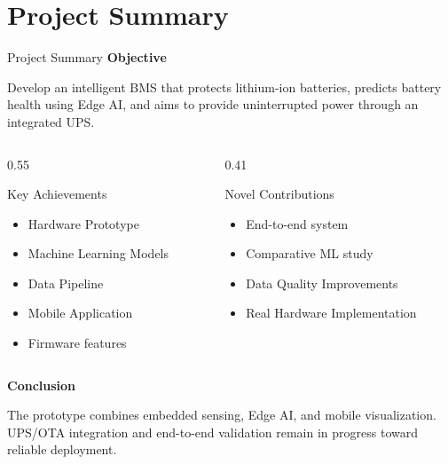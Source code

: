 \documentclass[10pt,aspectratio=43]{beamer}
\begin{document}
\section{Project Summary}
\begin{frame}{Project Summary}
  \footnotesize
  \textbf{Objective}\par
  \vspace{2pt}
  Develop an intelligent BMS that protects lithium-ion batteries, predicts battery health using Edge AI, and aims to provide uninterrupted power through an integrated UPS.
  \vspace{7pt}
 
  \begin{columns}[T,onlytextwidth]
    \begin{column}{0.55\textwidth}
      \begin{block}{Key Achievements}
        \begin{itemize}
          \setlength{\itemsep}{3pt}
            \item Hardware Prototype
            \item Machine Learning Models
            \item Data Pipeline
            \item Mobile Application
            \item Firmware features
        \end{itemize}
      \end{block}
    \end{column}
    \begin{column}{0.41\textwidth}
      \begin{block}{Novel Contributions}
        \begin{itemize}
          \setlength{\itemsep}{4pt}
          \item End-to-end system
          \item Comparative ML study
          \item Data Quality Improvements
          \item Real Hardware Implementation
        \end{itemize}
      \end{block}
    \end{column}
  \end{columns}

  \vspace{8pt}
  \textbf{Conclusion}\par
      \vspace{3pt}
      The prototype combines embedded sensing, Edge AI, and mobile visualization. UPS/OTA integration and end-to-end validation remain in progress toward reliable deployment.
\end{frame}
 
\end{document}
